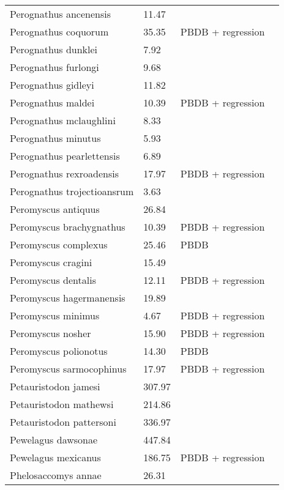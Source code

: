 \documentclass{article}
\begin{document}
\begin{center}
\begin{longtable}{p{} p{} p{} p{}}
    Perognathus ancenensis & 11.47 & \cite{Tomiya2013} &  \\ 
    Perognathus coquorum & 35.35 & PBDB + regression &  \\ 
    Perognathus dunklei & 7.92 & \cite{Tomiya2013} &  \\ 
    Perognathus furlongi & 9.68 & \cite{Tomiya2013} &  \\ 
    Perognathus gidleyi & 11.82 & \cite{Tomiya2013} &  \\ 
    Perognathus maldei & 10.39 & PBDB + regression &  \\ 
    Perognathus mclaughlini & 8.33 & \cite{Tomiya2013} &  \\ 
    Perognathus minutus & 5.93 & \cite{Tomiya2013} &  \\ 
    Perognathus pearlettensis & 6.89 & \cite{Tomiya2013} &  \\ 
    Perognathus rexroadensis & 17.97 & PBDB + regression &  \\ 
    Perognathus trojectioansrum & 3.63 & \cite{Tomiya2013} &  \\ 
    Peromyscus antiquus & 26.84 & \cite{Tomiya2013} &  \\ 
    Peromyscus brachygnathus & 10.39 & PBDB + regression &  \\ 
    Peromyscus complexus & 25.46 & PBDB &  \\ 
    Peromyscus cragini & 15.49 & \cite{Tomiya2013} &  \\ 
    Peromyscus dentalis & 12.11 & PBDB + regression &  \\ 
    Peromyscus hagermanensis & 19.89 & \cite{Tomiya2013} &  \\ 
    Peromyscus minimus & 4.67 & PBDB + regression &  \\ 
    Peromyscus nosher & 15.90 & PBDB + regression &  \\ 
    Peromyscus polionotus & 14.30 & PBDB &  \\ 
    Peromyscus sarmocophinus & 17.97 & PBDB + regression &  \\ 
    Petauristodon jamesi & 307.97 & \cite{Tomiya2013} &  \\ 
    Petauristodon mathewsi & 214.86 & \cite{Tomiya2013} &  \\ 
    Petauristodon pattersoni & 336.97 & \cite{Tomiya2013} &  \\ 
    Pewelagus dawsonae & 447.84 & \cite{Jepsen1932} &  \\ 
    Pewelagus mexicanus & 186.75 & PBDB + regression &  \\ 
    Phelosaccomys annae & 26.31 & \cite{Tomiya2013} &  \\ 

\end{longtable}
\end{center}
\end{document}
